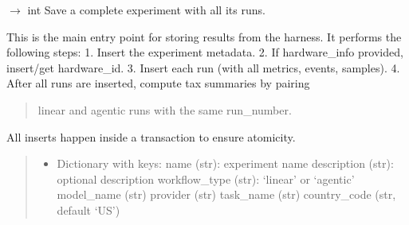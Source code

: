 \documentclass[letterpaper,10pt,english]{sphinxmanual}
\begin{document}
\begin{fulllineitems}
\begin{fulllineitems}
\begin{quote}
\begin{description}
\end{description}\end{quote}

\end{fulllineitems}


\begin{fulllineitems}
\label{\detokenize{core.database.manager_oldversion:core.database.manager_oldversion.DatabaseManager.save_experiment}}
\pysigstartsignatures
\pysiglinewithargsret
{}
{\sphinxparamcomma {}\sphinxparamcomma {}}
{{ $\rightarrow$ int}}
\pysigstopsignatures
\sphinxAtStartPar
Save a complete experiment with all its runs.

\sphinxAtStartPar
This is the main entry point for storing results from the harness.
It performs the following steps:
1. Insert the experiment metadata.
2. If hardware\_info provided, insert/get hardware\_id.
3. Insert each run (with all metrics, events, samples).
4. After all runs are inserted, compute tax summaries by pairing
\begin{quote}

\sphinxAtStartPar
linear and agentic runs with the same run\_number.
\end{quote}

\sphinxAtStartPar
All inserts happen inside a transaction to ensure atomicity.
\begin{quote}\begin{description}
\begin{itemize}
\item {} 
\sphinxAtStartPar
{} \textendash{} Dictionary with keys:
\sphinxhyphen{} name (str): experiment name
\sphinxhyphen{} description (str): optional description
\sphinxhyphen{} workflow\_type (str): ‘linear’ or ‘agentic’
\sphinxhyphen{} model\_name (str)
\sphinxhyphen{} provider (str)
\sphinxhyphen{} task\_name (str)
\sphinxhyphen{} country\_code (str, default ‘US’)


\end{itemize}
\end{description}
\end{quote}
\end{fulllineitems}
\end{fulllineitems}
\end{document}
